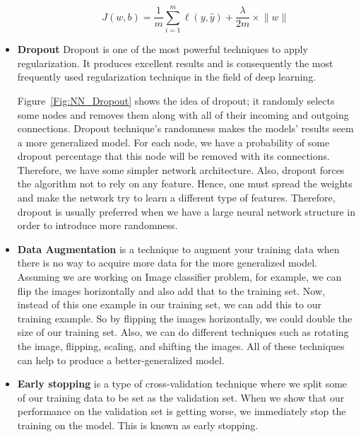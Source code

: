 \begin{itemize}
\begin{enumerate}
\begin{equation}\label{eq:regularization_l1}
J(w,b) = \frac{1}{m} \sum_{i=1}^{m} \ell(y,\widehat{y})+\frac{\lambda}{2m} \times \lVert w \rVert
\end{equation}
   \end{enumerate}
  \item \textbf{Dropout}
Dropout is one of the most powerful techniques to apply regularization. It produces excellent results and is consequently the most frequently used regularization technique in the field of deep learning.

Figure~\ref{Fig:NN_Dropout} shows the idea of dropout; it randomly selects some nodes and removes them along with all of their incoming and outgoing connections. Dropout technique’s randomness makes the models’ results seem a more generalized model. For each node, we have a probability of some dropout percentage that this node will be removed with its connections. Therefore, we have some simpler network architecture. Also, dropout forces the algorithm not to rely on any feature. Hence, one must spread the weights and make the network try to learn a different type of features. Therefore, dropout is usually preferred when we have a large neural network structure in order to introduce more randomness.%

\item \textbf{Data Augmentation} is a technique to augment your training data when there is no way to acquire more data for the more generalized model. Assuming we are working on Image classifier problem, for example, we can flip the images horizontally and also add that to the training set. Now, instead of this one example in our training set, we can add this to our training example. So by flipping the images horizontally, we could double the size of our training set. Also, we can do different techniques such as rotating the image, flipping, scaling, and shifting the images. All of these techniques can help to produce a better-generalized model.%

\item \textbf{Early stopping} is a type of cross-validation technique where we split some of our training data to be set as the validation set. When we show that our performance on the validation set is getting worse, we immediately stop the training on the model. This is known as early stopping.%

\end{itemize}

